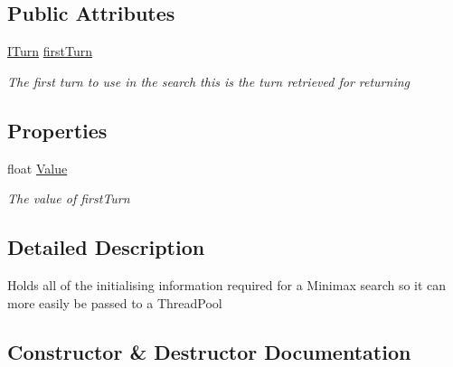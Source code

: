 \subsection*{Public Attributes}
\begin{DoxyCompactItemize}
\item 
\hyperlink{interface_universal_turn_based_a_i_1_1_i_turn}{I\+Turn} \hyperlink{class_universal_turn_based_a_i_1_1_minimax_worker_a7b1186503a4def5fa695b58502d05c9b}{first\+Turn}
\begin{DoxyCompactList}\small\item\em The first turn to use in the search this is the turn retrieved for returning \end{DoxyCompactList}\end{DoxyCompactItemize}
\subsection*{Properties}
\begin{DoxyCompactItemize}
\item 
float \hyperlink{class_universal_turn_based_a_i_1_1_minimax_worker_aba59322c19f8226090dfaf8d7b5d8737}{Value}
\begin{DoxyCompactList}\small\item\em The value of {\itshape first\+Turn}  \end{DoxyCompactList}\end{DoxyCompactItemize}


\subsection{Detailed Description}
Holds all of the initialising information required for a Minimax search so it can more easily be passed to a Thread\+Pool 



\subsection{Constructor \& Destructor Documentation}
\hypertarget{class_universal_turn_based_a_i_1_1_minimax_worker_aefc299364d8cbc30ebb6caba179703d7}{}
